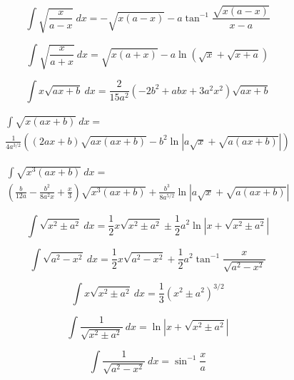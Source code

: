 \begin{equation*}
\int \sqrt{\frac{x}{a-x}}\ dx =  -\sqrt{x(a-x)}
-a\tan^{-1}\frac{\sqrt{x(a-x)}}{x-a}
\end{equation*}

\begin{equation*}
\int \sqrt{\frac{x}{a+x}}\ dx =  \sqrt{x(a+x)} 
-a\ln \left ( \sqrt{x} + \sqrt{x+a}\right ) 
\end{equation*}

\begin{equation*}
\int x \sqrt{ax + b}\ dx =
\frac{2}{15 a^2}(-2b^2+abx + 3 a^2 x^2)
\sqrt{ax+b}
\end{equation*}

\begin{multline*}
\int \sqrt{x(ax+b)}\ dx =\\
 \frac{1}{4a^{3/2}}\left((2ax + b)\sqrt{ax(ax+b)} 
-b^2 \ln \left| a\sqrt{x} + \sqrt{a(ax+b)} \right| \right) 
\end{multline*}

\begin{multline*}
\int \sqrt{x^3(ax+b)} \ dx =\\
\left (
\frac{b}{12a}-
\frac{b^2}{8a^2x}+
\frac{x}{3}\right)
\sqrt{x^3(ax+b)}  +
\frac{b^3}{8a^{5/2}}\ln \left | a\sqrt{x} + \sqrt{a(ax+b)} \right |
\end{multline*}

\begin{equation*}
\int\sqrt{x^2 \pm a^2}\ dx = \frac{1}{2}x\sqrt{x^2\pm a^2} 
\pm\frac{1}{2}a^2 \ln \left | x + \sqrt{x^2\pm a^2} \right | 
\end{equation*}

\begin{equation*}
\int  \sqrt{a^2 - x^2}\ dx = \frac{1}{2} x \sqrt{a^2-x^2} 
+\frac{1}{2}a^2\tan^{-1}\frac{x}{\sqrt{a^2-x^2}}
\end{equation*}

\begin{equation*}
\int  x \sqrt{x^2 \pm a^2}\ dx= \frac{1}{3}\left ( x^2 \pm a^2 \right)^{3/2} 
\end{equation*}

\begin{equation*}
\int \frac{1}{\sqrt{x^2 \pm a^2}}\ dx = \ln \left | x + \sqrt{x^2 \pm a^2} \right | 
\end{equation*}

\begin{equation*}
\int \frac{1}{\sqrt{a^2 - x^2}}\ dx = \sin^{-1}\frac{x}{a} 
\end{equation*}


